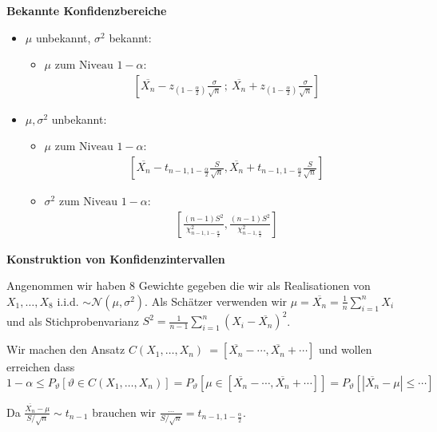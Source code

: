 \documentclass[25pt]{sciposter}
\newenvironment{thm}[1]{\begin{mdframed}[backgroundcolor=pink!20,innertopmargin=15pt, innerbottommargin=15pt, nobreak=true]
		\textbf{#1 }
	}
	{ 
	\end{mdframed}
}
\begin{document}
\begin{multicols}{3}
\begin{thm}{Bekannte Konfidenzbereiche}
\begin{itemize}
	\item 	$\mu$ unbekannt, $\sigma^2$ bekannt:
	\begin{itemize}
		\item $\mu \text{ zum Niveau } 1-\alpha$:
		\begin{align*}
			{\displaystyle \left[{{\overline{X_n}}-z_{(1-{\tfrac {\alpha }{2}})}{\frac {\sigma }{\sqrt {n}}}\ ;\ {\overline{X_n}}+z_{(1-{\tfrac {\alpha }{2}})}{\frac {\sigma }{\sqrt {n}}}}\right]}
		\end{align*}
	\end{itemize}
	\item 	$\mu, \sigma^2$ unbekannt:
	\begin{itemize}
\item $\mu \text{ zum Niveau } 1-\alpha$:
	\begin{align*}
  \left[ \overline{X_n} -t_{n-1,1-\frac{\alpha}{2}}\frac{S}{\sqrt{n}} , \overline{X_n} +t_{n-1,1-\frac{\alpha}{2}}\frac{S}{\sqrt{n}}   \right]
	\end{align*}
	\item $\sigma^2 \text{ zum Niveau } 1-\alpha$:
	\begin{align*}
\left[ \frac{(n-1)S^2}{\chi_{n-1,1-\frac{\alpha}{2}}^2} , \frac{(n-1)S^2}{\chi_{n-1,\frac{\alpha}{2}}^2}\right]
	\end{align*}
	\end{itemize}
\end{itemize}
\end{thm}

\textbf{Konstruktion von Konfidenzintervallen}

Angenommen wir haben 8 Gewichte gegeben die wir als Realisationen von $X_1,\ldots,X_8$ i.i.d. $\sim \mathcal{N}(\mu,\sigma^2)$. Als Schätzer verwenden wir $\mu = \overline{X_n} = \frac{1}{n} \sum_{i=1}^{n} X_i$ und als Stichprobenvarianz $S^2 = \frac{1}{n-1} \sum_{i=1}^{n} (X_i - \overline{X_n})^2$.

Wir machen den Ansatz $C(X_1,\ldots,X_n) \ = \left[\overline{X_n} - \cdots , \overline{X_n} + \cdots \right]$ und wollen erreichen dass $1-\alpha \leq 	P_{\vartheta} \left[\vartheta \in C(X_1,\ldots,X_n) \right] = 	P_{\vartheta} \left[\mu  \in \left[\overline{X_n} - \cdots , \overline{X_n} + \cdots\right] \right] = P_{\vartheta} \left[ |\overline{X_n} - \mu| \leq \cdots \right]$

Da $\frac{\overline{X_n} - \mu}{S/\sqrt{n}} \sim t_{n-1}$ brauchen wir $\frac{...}{S/\sqrt{n}} = t_{n-1,1-\frac{\alpha}{2}}$.


\end{multicols}
\end{document}
